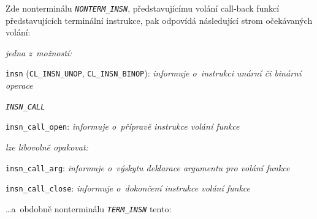 \bigskip
\noindent
Zde nonterminálu \texttt{\textit{NONTERM\_INSN}}, představujícímu volání call-back funkcí
představujících terminální instrukce, pak odpovídá následující strom očekávaných
volání:

\smallskip
\begin{myitemize}[itemsep=0pt,partopsep=0pt,parsep=0pt,topsep=0pt,label=\textbullet]
  \item[\ndash] \textsl{jedna z~možností:}
    \begin{myitemize}[itemsep=0pt,partopsep=0pt,parsep=0pt,topsep=0pt,label=\textbullet]
      \item \texttt{insn} (\texttt{CL\_INSN\_UNOP},
                           \texttt{CL\_INSN\_BINOP}): \textit{informuje o~instrukci unární či binární operace}
      \item[\whitebullet] \texttt{\textit{INSN\_CALL}}
        \begin{myitemize}[itemsep=0pt,partopsep=0pt,parsep=0pt,topsep=0pt,label=\textbullet]
          \item \texttt{insn\_call\_open}: \textit{informuje o~přípravě instrukce volání funkce}
          \item[\ndash] \textsl{lze libovolně opakovat:}
            \begin{myitemize}[itemsep=0pt,partopsep=0pt,parsep=0pt,topsep=0pt,label=\textbullet]
              \item \texttt{insn\_call\_arg}: \textit{informuje o~výskytu deklarace argumentu pro volání funkce}
            \end{myitemize}
          \item \texttt{insn\_call\_close}: \textit{informuje o~dokončení instrukce volání funkce}
        \end{myitemize}
    \end{myitemize}
\end{myitemize}

\bigskip
\noindent
\dots a~obdobně nonterminálu \texttt{\textit{TERM\_INSN}} tento:

